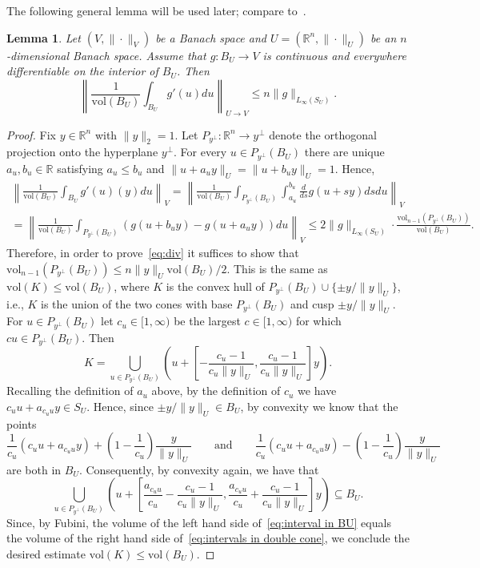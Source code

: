 \documentclass[12pt,reqno]{amsart}
\theoremstyle{plain}
\newtheorem{lemma}[theorem]{Lemma}
\theoremstyle{definition}
\renewcommand{\le}{\leqslant}
\newcommand{\R}{\mathbb R}
\newcommand{\vol}{\mathrm{vol}}
\begin{document}
The following general lemma will be used later; compare to~\cite[Prop.~1]{JMS09}.

\begin{lemma}\label{lem:U}
Let $(V,\|\cdot\|_V)$ be a Banach space and $U=(\R^n,\|\cdot\|_U)$ be an $n$-dimensional Banach space. Assume that  $g: B_U\to V$ is continuous and everywhere differentiable on the interior of $B_U$. Then
\begin{equation}\label{eq:div}
\left\|\frac{1}{\vol(B_U)}\int_{B_U}g'(u)du\right\|_{U\to V}\le n\|g\|_{L_\infty(S_U)}.
\end{equation}
\end{lemma}

\begin{proof}
Fix $y\in \R^n$ with $\|y\|_2=1$. Let $P_{y^\perp}:\R^n\to y^\perp$ denote the orthogonal projection onto the hyperplane $y^\perp$. For every $u\in P_{y^\perp}(B_U)$ there are unique $a_u,b_u\in \R$ satisfying $a_u\le b_u$ and $\|u+a_u y\|_U=\|u+b_u y\|_U=1$. Hence,
\begin{multline*}
\left\|\frac{1}{\vol(B_U)}\int_{B_U}g'(u)(y)du\right\|_{V}=\left\|\frac{1}{\vol(B_U)}\int_{P_{y^{\perp}}(B_U)} \int_{a_u}^{b_u} \frac{d}{ds} g(u+sy) ds du\right\|_V\\=
\left\|\frac{1}{\vol(B_U)}\int_{P_{y^\perp}(B_U)} \left(g(u+b_u y) -g(u+a_u y)\right) du\right\|_V\le 2\|g\|_{L_\infty(S_U)}\cdot\frac{\vol_{n-1} (P_{y^\perp}(B_U))}{\vol(B_U)}.
\end{multline*}
Therefore, in order to prove~\eqref{eq:div} it suffices to show that $\vol_{n-1} (P_{y^\perp}(B_U))\le n\|y\|_U\vol(B_U)/2$. This is the same as  $\vol(K)\le \vol(B_U)$, where $K$ is the convex hull of $P_{y^\perp}(B_U)\cup\{\pm y/\|y\|_U\}$, i.e., $K$ is the union of the two cones with base $P_{y^\perp}(B_U)$ and cusp $\pm y/\|y\|_U$. For $u\in P_{y^{\perp}}(B_U)$ let $c_u\in [1,\infty)$ be the largest $c\in [1,\infty)$ for which $cu\in P_{y^{\perp}}(B_U)$. Then
\begin{equation}\label{eq:intervals in double cone}
K=\bigcup_{u\in P_{y^{\perp}}(B_U)} \left(u+\left[-\frac{c_u-1}{c_u\|y\|_U},\frac{c_u-1}{c_u\|y\|_U}\right]y\right).
\end{equation}
Recalling the definition of $a_u$ above, by the definition of $c_u$ we have $c_uu+a_{c_uu}y\in S_U$. Hence, since $\pm y/\|y\|_U\in B_U$, by convexity we know that the points
$$
\frac{1}{c_u}\left(c_uu+a_{c_uu}y\right)+\left(1-\frac{1}{c_u}\right)\frac{y}{\|y\|_U}\qquad \mathrm{and}\qquad \frac{1}{c_u}\left(c_uu+a_{c_uu}y\right)-\left(1-\frac{1}{c_u}\right)\frac{y}{\|y\|_U}
$$
are both in $B_U$. Consequently, by convexity again, we have that
\begin{equation}\label{eq:interval in BU}
\bigcup_{u\in P_{y^{\perp}}(B_U)} \left( u+\left[\frac{a_{c_uu}}{c_u}-\frac{c_u-1}{c_u\|y\|_U},\frac{a_{c_uu}}{c_u}+\frac{c_u-1}{c_u\|y\|_U}\right]y\right)\subseteq B_U.
\end{equation}
Since, by Fubini, the volume of the left hand side of~\eqref{eq:interval in BU} equals the volume of the right hand side of~\eqref{eq:intervals in double cone}, we conclude the desired estimate  $\vol(K)\le \vol(B_U)$.
\end{proof}
\end{document}
